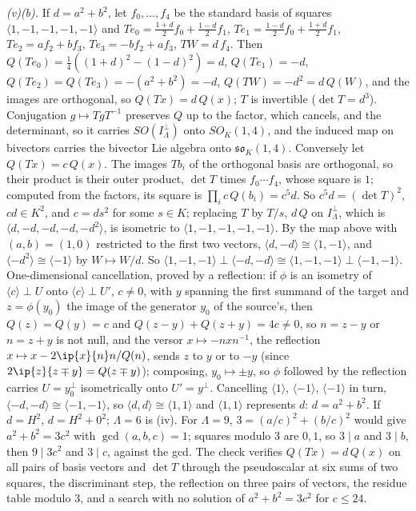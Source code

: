 \emph{(v)(b).} If $d = a^{2} + b^{2}$, let $f_{0}, \dots, f_{4}$ be the standard basis of squares $\langle 1, -1, -1, -1, -1\rangle$ and $T e_{0} = \tfrac{1+d}{2}f_{0} + \tfrac{1-d}{2}f_{1}$, $T e_{1} = \tfrac{1-d}{2}f_{0} + \tfrac{1+d}{2}f_{1}$, $T e_{2} = af_{2} + bf_{3}$, $T e_{3} = -bf_{2} + af_{3}$, $T W = d\,f_{4}$. Then $Q(Te_{0}) = \tfrac14((1+d)^{2} - (1-d)^{2}) = d$, $Q(Te_{1}) = -d$, $Q(Te_{2}) = Q(Te_{3}) = -(a^{2} + b^{2}) = -d$, $Q(TW) = -d^{2} = d\,Q(W)$, and the images are orthogonal, so $Q(Tx) = d\,Q(x)$; $T$ is invertible ($\det T = d^{3}$). Conjugation $g \mapsto TgT^{-1}$ preserves $Q$ up to the factor, which cancels, and the determinant, so it carries $SO(I_{\Lambda}^{\perp})$ onto $SO_{K}(1,4)$, and the induced map on bivectors carries the bivector Lie algebra onto $\mathfrak{so}_{K}(1,4)$. Conversely let $Q(Tx) = c\,Q(x)$. The images $Tb_{i}$ of the orthogonal basis are orthogonal, so their product is their outer product, $\det T$ times $f_{0}\cdots f_{4}$, whose square is $1$; computed from the factors, its square is $\prod_{i}c\,Q(b_{i}) = c^{5}d$. So $c^{5}d = (\det T)^{2}$, $cd \in K^{2}$, and $c = ds^{2}$ for some $s \in K$; replacing $T$ by $T/s$, $d\,Q$ on $I_{\Lambda}^{\perp}$, which is $\langle d, -d, -d, -d, -d^{2}\rangle$, is isometric to $\langle 1, -1, -1, -1, -1\rangle$. By the map above with $(a, b) = (1, 0)$ restricted to the first two vectors, $\langle d, -d\rangle \cong \langle 1, -1\rangle$, and $\langle -d^{2}\rangle \cong \langle -1\rangle$ by $W \mapsto W/d$. So $\langle 1, -1, -1\rangle \perp \langle -d, -d\rangle \cong \langle 1, -1, -1\rangle \perp \langle -1, -1\rangle$. One-dimensional cancellation, proved by a reflection: if $\phi$ is an isometry of $\langle c\rangle \perp U$ onto $\langle c\rangle \perp U'$, $c \neq 0$, with $y$ spanning the first summand of the target and $z = \phi(y_{0})$ the image of the generator $y_{0}$ of the source's, then $Q(z) = Q(y) = c$ and $Q(z - y) + Q(z + y) = 4c \neq 0$, so $n = z - y$ or $n = z + y$ is not null, and the versor $x \mapsto -nxn^{-1}$, the reflection $x \mapsto x - 2\ip{x}{n}n/Q(n)$, sends $z$ to $y$ or to $-y$ (since $2\ip{z}{z \mp y} = Q(z \mp y)$); composing, $y_{0} \mapsto \pm y$, so $\phi$ followed by the reflection carries $U = y_{0}^{\perp}$ isometrically onto $U' = y^{\perp}$. Cancelling $\langle 1\rangle$, $\langle -1\rangle$, $\langle -1\rangle$ in turn, $\langle -d, -d\rangle \cong \langle -1, -1\rangle$, so $\langle d, d\rangle \cong \langle 1, 1\rangle$ and $\langle 1, 1\rangle$ represents $d$: $d = a^{2} + b^{2}$. If $d = H^{2}$, $d = H^{2} + 0^{2}$; $\Lambda = 6$ is (iv). For $\Lambda = 9$, $3 = (a/c)^{2} + (b/c)^{2}$ would give $a^{2} + b^{2} = 3c^{2}$ with $\gcd(a, b, c) = 1$; squares modulo $3$ are $0, 1$, so $3 \mid a$ and $3 \mid b$, then $9 \mid 3c^{2}$ and $3 \mid c$, against the gcd. The check verifies $Q(Tx) = d\,Q(x)$ on all pairs of basis vectors and $\det T$ through the pseudoscalar at six sums of two squares, the discriminant step, the reflection on three pairs of vectors, the residue table modulo $3$, and a search with no solution of $a^{2} + b^{2} = 3c^{2}$ for $c \le 24$.

